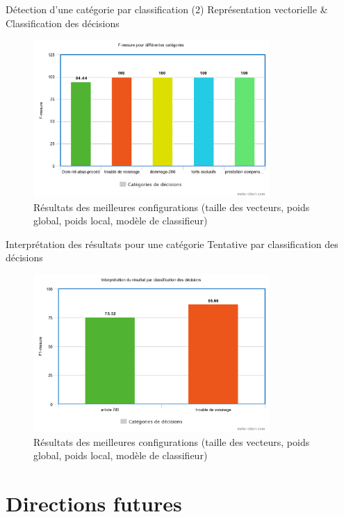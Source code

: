 \documentclass[newPxFont,pagenumber]{beamer}
\begin{document}
\begin{frame}{Détection d'une catégorie par classification}
(2) Représentation vectorielle \& Classification des décisions
\begin{figure}
\includegraphics[width=0.8\textwidth]{f-mesure-classif.png}
\caption{Résultats des meilleures configurations (taille des vecteurs, poids global, poids local, modèle de classifieur)}
\end{figure}
\end{frame}

\begin{frame}{Interprétation des résultats pour une catégorie}
Tentative par classification des décisions
\begin{figure}
\includegraphics[width=0.8\textwidth]{classifResultat.png}
\caption{Résultats des meilleures configurations (taille des vecteurs, poids global, poids local, modèle de classifieur)}
\end{figure}
\end{frame}

\section{Directions futures}
\end{document}
